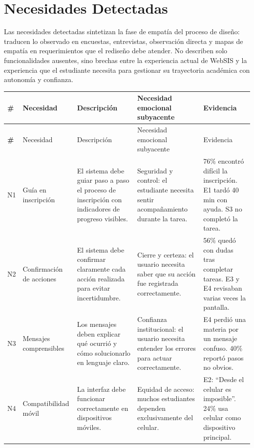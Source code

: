 \section{Necesidades Detectadas}

Las necesidades detectadas sintetizan la fase de empatía del proceso de diseño: traducen lo observado en encuestas, entrevistas, observación directa y mapas de empatía en requerimientos que el rediseño debe atender. No describen solo funcionalidades ausentes, sino brechas entre la experiencia actual de WebSIS y la experiencia que el estudiante necesita para gestionar su trayectoria académica con autonomía y confianza.


{\scriptsize
\setlength{\tabcolsep}{3pt}
\renewcommand{\arraystretch}{1.1}

\begin{longtable}{|>{\bfseries}p{0.6cm}|p{2.6cm}|p{4.1cm}|p{3.7cm}|p{3.7cm}|}
\hline
\# & Necesidad & Descripción & Necesidad emocional subyacente & Evidencia \\
\hline
\endfirsthead

\hline
\# & Necesidad & Descripción & Necesidad emocional subyacente & Evidencia \\
\hline
\endhead

N1 & Guía en inscripción & El sistema debe guiar paso a paso el proceso de inscripción con indicadores de progreso visibles. & Seguridad y control: el estudiante necesita sentir acompañamiento durante la tarea. & 76\% encontró difícil la inscripción. E1 tardó 40 min con ayuda. S3 no completó la tarea. \\
\hline

N2 & Confirmación de acciones & El sistema debe confirmar claramente cada acción realizada para evitar incertidumbre. & Cierre y certeza: el usuario necesita saber que su acción fue registrada correctamente. & 56\% quedó con dudas tras completar tareas. E3 y E4 revisaban varias veces la pantalla. \\
\hline

N3 & Mensajes comprensibles & Los mensajes deben explicar qué ocurrió y cómo solucionarlo en lenguaje claro. & Confianza institucional: el usuario necesita entender los errores para actuar correctamente. & E4 perdió una materia por un mensaje confuso. 40\% reportó pasos no obvios. \\
\hline

N4 & Compatibilidad móvil & La interfaz debe funcionar correctamente en dispositivos móviles. & Equidad de acceso: muchos estudiantes dependen exclusivamente del celular. & E2: “Desde el celular es imposible”. 24\% usa celular como dispositivo principal. \\
\hline


\end{longtable}}
